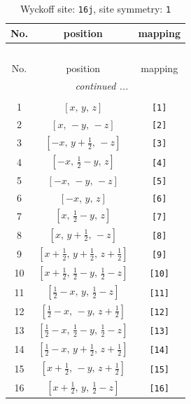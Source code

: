 \documentclass[fleqn,8pt]{jsarticle}
\begin{document}
\begin{longtable}{ccc}
\caption{Wyckoff site: {\tt 16j}, site symmetry: {\tt 1}}
 \\
 \hline \hline
No. & position & mapping \\ \hline \endfirsthead

\multicolumn{2}{l}{\tablename\ \thetable{}} \\
 \hline \hline
No. & position & mapping \\ \hline \endhead

 \hline \hline
\multicolumn{2}{r}{\footnotesize\it continued ...} \\ \endfoot

 \hline \hline
\multicolumn{2}{r}{} \\ \endlastfoot

1 & $\left[ x,\, y,\, z \right]$ & {\tt [1]} \\ \hline
2 & $\left[ x,\, - y,\, - z \right]$ & {\tt [2]} \\ \hline
3 & $\left[ - x,\, y + \frac{1}{2},\, - z \right]$ & {\tt [3]} \\ \hline
4 & $\left[ - x,\, \frac{1}{2} - y,\, z \right]$ & {\tt [4]} \\ \hline
5 & $\left[ - x,\, - y,\, - z \right]$ & {\tt [5]} \\ \hline
6 & $\left[ - x,\, y,\, z \right]$ & {\tt [6]} \\ \hline
7 & $\left[ x,\, \frac{1}{2} - y,\, z \right]$ & {\tt [7]} \\ \hline
8 & $\left[ x,\, y + \frac{1}{2},\, - z \right]$ & {\tt [8]} \\ \hline
9 & $\left[ x + \frac{1}{2},\, y + \frac{1}{2},\, z + \frac{1}{2} \right]$ & {\tt [9]} \\ \hline
10 & $\left[ x + \frac{1}{2},\, \frac{1}{2} - y,\, \frac{1}{2} - z \right]$ & {\tt [10]} \\ \hline
11 & $\left[ \frac{1}{2} - x,\, y,\, \frac{1}{2} - z \right]$ & {\tt [11]} \\ \hline
12 & $\left[ \frac{1}{2} - x,\, - y,\, z + \frac{1}{2} \right]$ & {\tt [12]} \\ \hline
13 & $\left[ \frac{1}{2} - x,\, \frac{1}{2} - y,\, \frac{1}{2} - z \right]$ & {\tt [13]} \\ \hline
14 & $\left[ \frac{1}{2} - x,\, y + \frac{1}{2},\, z + \frac{1}{2} \right]$ & {\tt [14]} \\ \hline
15 & $\left[ x + \frac{1}{2},\, - y,\, z + \frac{1}{2} \right]$ & {\tt [15]} \\ \hline
16 & $\left[ x + \frac{1}{2},\, y,\, \frac{1}{2} - z \right]$ & {\tt [16]} \\
\end{longtable}
\end{document}
